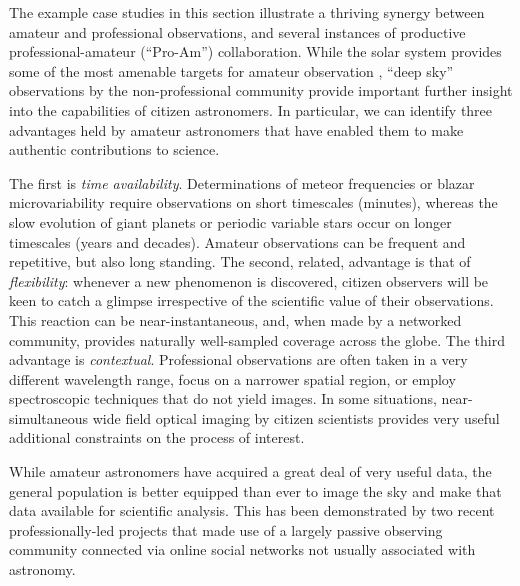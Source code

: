 \documentclass{ar2e}
\def\CaseStudy#1{\noindent{\it\bf #1 \,\,\,\,}}
\begin{document}
The example case studies in this section illustrate a thriving synergy between
amateur and professional observations, and several instances of productive
professional-amateur (``Pro-Am'') collaboration. While the solar system provides
some of the most amenable targets for amateur observation
\citep{14mousis_proam}, ``deep sky'' observations by the non-professional
community provide important further insight into the capabilities  of citizen
astronomers. In particular, we can identify three advantages held by amateur
astronomers that have enabled them to make authentic contributions to science.

The first is \textit{time availability}. Determinations of meteor frequencies or
blazar microvariability require observations on short timescales (minutes),
whereas the slow evolution of giant planets or periodic variable stars occur on
longer timescales (years and decades).  Amateur observations can be  frequent
and repetitive, but also long standing.  The second, related, advantage is that
of \textit{flexibility}: whenever a new phenomenon is discovered, citizen
observers will be keen to catch a glimpse irrespective of the scientific value
of their observations.  This reaction can be near-instantaneous, and, when made
by a networked community, provides naturally well-sampled coverage across the
globe. The third advantage is \textit{contextual}.  Professional observations
are often taken in a very different wavelength range, focus on a narrower
spatial region, or employ spectroscopic techniques that do not yield images. In
some situations, near-simultaneous wide field optical imaging by citizen
scientists provides very useful additional constraints on the process of
interest.



\CaseStudy{``Passive Observing.''}
While amateur astronomers have acquired a great deal of very useful data, the
general population is better equipped than ever to image the sky and make that
data available for scientific analysis. This has been demonstrated by two
recent professionally-led projects that made use of a largely passive
observing community connected via online social networks not usually
associated with astronomy. 
\end{document}
